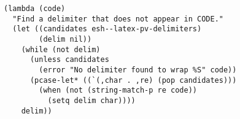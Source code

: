 \documentclass{article}
\begin{document}
\begin{verbatim}
(lambda (code)
  "Find a delimiter that does not appear in CODE."
  (let ((candidates esh--latex-pv-delimiters)
        (delim nil))
    (while (not delim)
      (unless candidates
        (error "No delimiter found to wrap %S" code))
      (pcase-let* ((`(,char . ,re) (pop candidates)))
        (when (not (string-match-p re code))
          (setq delim char))))
    delim))
\end{verbatim}
\end{document}
